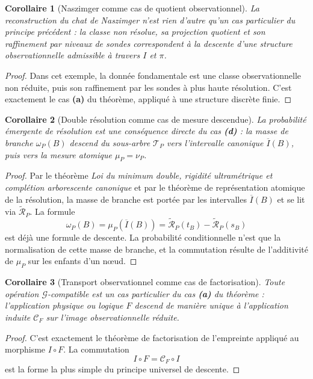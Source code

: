\documentclass[11pt,a4paper]{article}
\newtheorem{corollary}{Corollaire}
\begin{document}
\begin{appendices}
\begin{corollary}[Naszimger comme cas de quotient observationnel]
La reconstruction du chat de Naszimger n'est rien d'autre qu'un cas particulier du principe précédent : la classe non résolue, sa projection quotient et son raffinement par niveaux de sondes correspondent à la descente d'une structure observationnelle admissible à travers \(I\) et \(\pi\).
\end{corollary}

\begin{proof}
Dans cet exemple, la donnée fondamentale est une classe observationnelle non réduite, puis son raffinement par les sondes à plus haute résolution. C'est exactement le cas \textbf{(a)} du théorème, appliqué à une structure discrète finie.
\end{proof}

\begin{corollary}[Double résolution comme cas de mesure descendue]
La probabilité émergente de résolution est une conséquence directe du cas \textbf{(d)} : la masse de branche \(\omega_P(B)\) descend du sous-arbre \(\mathcal T_P\) vers l'intervalle canonique \(\overline I(B)\), puis vers la mesure atomique \(\mu_P=\nu_P\).
\end{corollary}

\begin{proof}
Par le théorème \emph{Loi du minimum double, rigidité ultramétrique et complétion arborescente canonique} et par le théorème de représentation atomique de la résolution, la masse de branche est portée par les intervalles \(\overline I(B)\) et se lit via \(\widetilde{\mathcal R}_P\). La formule
\[
\omega_P(B)=\mu_P(\overline I(B))=\widetilde{\mathcal R}_P(t_B)-\widetilde{\mathcal R}_P(s_B)
\]
est déjà une formule de descente. La probabilité conditionnelle n'est que la normalisation de cette masse de branche, et la commutation résulte de l'additivité de \(\mu_P\) sur les enfants d'un nœud.
\end{proof}

\begin{corollary}[Transport observationnel comme cas de factorisation]
Toute opération \(\mathcal G\)-compatible est un cas particulier du cas \textbf{(a)} du théorème : l'application physique ou logique \(F\) descend de manière unique à l'application induite \(\mathcal C_F\) sur l'image observationnelle réduite.
\end{corollary}

\begin{proof}
C'est exactement le théorème de factorisation de l'empreinte appliqué au morphisme \(I\circ F\). La commutation
\[
I\circ F=\mathcal C_F\circ I
\]
est la forme la plus simple du principe universel de descente.
\end{proof}


\end{appendices}
\end{document}
